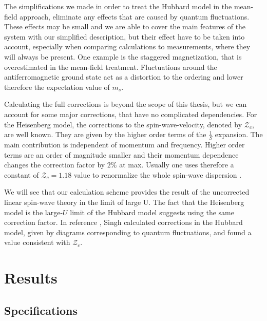 \documentclass[a4paper,10pt]{report}
\begin{document}
The simplifications we made in order to treat the Hubbard model in the mean-field approach,  
eliminate any effects that are caused by quantum fluctuations.
These effects may be small and we are able to cover the main features of the system with our simplified description,
but their effect have to be taken into account, especially when comparing calculations to measurements, where they will always be present.
One example is the staggered magnetization, that is overestimated in the mean-field treatment. 
Fluctuations around the antiferromagnetic ground state act as a distortion to the ordering and lower therefore the expectation value of $m_s$.


Calculating the full corrections is beyond the scope of this thesis, but we can account for some major corrections, that have no complicated dependencies.
For the Heisenberg model, the corrections to the spin-wave-velocity, denoted by $\mathcal{Z}_c$, are well known.
They are given by the higher order terms of the $\frac1S$ expansion. 
The main contribution is independent of momentum and frequency. 
Higher order terms are an order of magnitude smaller and their momentum dependence changes the correction factor by $2\%$ at max.
Usually one uses therefore a constant of $\mathcal{Z}_c=1.18$ value to renormalize the whole spin-wave dispersion \cite{PhysRevB.45.10131}.

We will see that our calculation scheme provides the result of the uncorrected linear spin-wave theory in the limit of large U. 
The fact that the Heisenberg model is the large-$U$ limit of the Hubbard model suggests using the same correction factor.
In reference \cite{PhysRevB.43.3617}, Singh calculated corrections in the Hubbard model, 
given by diagrams corresponding to quantum fluctuations,
and found a value consistent with $\mathcal{Z}_c$.







 
 
\chapter{Results}

\section{Specifications} %
\end{document}
